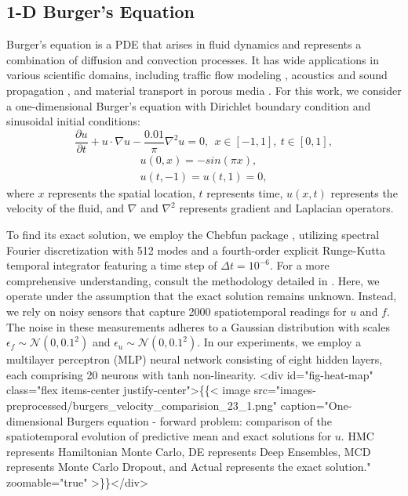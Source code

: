 \documentclass{article}
\begin{document}
\subsection{1-D Burger’s Equation}
Burger's equation is a PDE that arises in fluid dynamics and represents a combination of diffusion and convection processes.
It has wide applications in various scientific domains, including traffic flow modeling \citep{nagatani2000density}, acoustics and sound propagation \citep{naugolnykh2000nonlinear}, and material transport in porous media \citep{shah2016solution}.
For this work, we consider a one-dimensional Burger's equation with Dirichlet boundary condition and sinusoidal initial conditions:
\begin{equation}
\frac{\partial u}{\partial t} + u \cdot \nabla u- \frac{0.01}{\pi} \nabla^2 u = 0, ~~ x \in [-1,1], ~ t\in [0,1],
\end{equation} 
\vspace{-0.65cm}
\begin{gather*}
u(0,x) = - sin(\pi x), \\
u(t,-1) = u(t,1) = 0,
\end{gather*}
where $x$ represents the spatial location, $t$ represents time, $u (x,t)$ represents the velocity of the fluid, and $\nabla$ and $\nabla^2$ represents gradient and Laplacian operators.

To find its exact solution, we employ the Chebfun package \citep{rico1994continuous}, utilizing spectral Fourier discretization with 512 modes and a fourth-order explicit Runge-Kutta temporal integrator featuring a time step of $\Delta t=10^{-6}$. 
 For a more comprehensive understanding, consult the methodology detailed in \citep{raissi2019physics}.
Here, we operate under the assumption that the exact solution remains unknown.
Instead, we rely on noisy sensors that capture 2000 spatiotemporal readings for $u$ and $f$. 
The noise in these measurements adheres to a Gaussian distribution with scales $\epsilon_f \sim \mathcal{N}(0, 0.1^2)$ and $\epsilon_u \sim \mathcal{N}(0, 0.1^2)$. 
In our experiments, we employ a multilayer perceptron (MLP) neural network consisting of eight hidden layers, each comprising 20 neurons with tanh non-linearity.
<div id="fig-heat-map" class="flex items-center justify-center">\{\{< image src="images-preprocessed/burgers_velocity_comparision_23_1.png" caption="One-dimensional Burgers equation - forward problem: comparison of the spatiotemporal evolution of predictive mean and exact solutions for $u$. HMC represents Hamiltonian Monte Carlo, DE represents Deep Ensembles, MCD represents Monte Carlo Dropout, and Actual represents the exact solution." zoomable="true" >\}\}</div>
\end{document}
